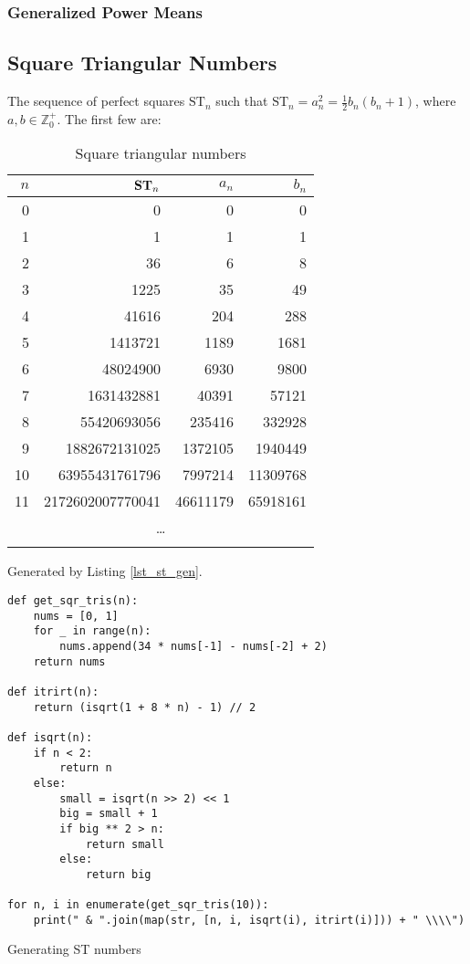 \documentclass[fleqn,a4paper,11pt]{article}
\newcommand{\setstyle}{\mathbb}
\newcommand{\Integers}{\setstyle Z}
\newenvironment{longlisting}
{\addvspace{\baselineskip}\captionsetup{type=listing}}
{\addvspace{\baselineskip}}
\begin{document}
    \subsubsection{Generalized Power Means}

    \subsection{Square Triangular Numbers}


    The sequence of perfect squares \(\mathrm{ST}_n\) such that
    \(\mathrm{ST}_n= a_n^2 = \frac 12 b_n(b_n + 1)\), where
    \(a, b \in \Integers_0^+\). The first few are:

    \begin{longtable}{rrrr}
    \toprule
    \boldmath\(n\) & \boldmath\(\text{\bfseries ST}_n\) & \boldmath\(a_n\) &
                   \boldmath\(b_n\) \\
    \midrule
    \endhead
    0 & 0 & 0 & 0 \\
    1 & 1 & 1 & 1 \\
    2 & 36 & 6 & 8 \\
    3 & 1225 & 35 & 49 \\
    4 & 41616 & 204 & 288 \\
    5 & 1413721 & 1189 & 1681 \\
    6 & 48024900 & 6930 & 9800 \\
    7 & 1631432881 & 40391 & 57121 \\
    8 & 55420693056 & 235416 & 332928 \\
    9 & 1882672131025 & 1372105 & 1940449 \\
    10 & 63955431761796 & 7997214 & 11309768 \\
    11 & 2172602007770041 & 46611179 & 65918161 \\
    \multicolumn{4}{c}{\dots} \\
    \bottomrule
    \caption{Square triangular numbers}
    \end{longtable}

    Generated by Listing \ref{lst_st_gen}.

    \begin{longlisting}
    \begin{verbatim}
def get_sqr_tris(n):
    nums = [0, 1]
    for _ in range(n):
        nums.append(34 * nums[-1] - nums[-2] + 2)
    return nums

def itrirt(n):
    return (isqrt(1 + 8 * n) - 1) // 2

def isqrt(n):
    if n < 2:
        return n
    else:
        small = isqrt(n >> 2) << 1
        big = small + 1
        if big ** 2 > n:
            return small
        else:
            return big

for n, i in enumerate(get_sqr_tris(10)):
    print(" & ".join(map(str, [n, i, isqrt(i), itrirt(i)])) + " \\\\")
    \end{verbatim}
    \caption{Generating ST numbers}\label{lst_st_gen}
    \end{longlisting}
\end{document}

